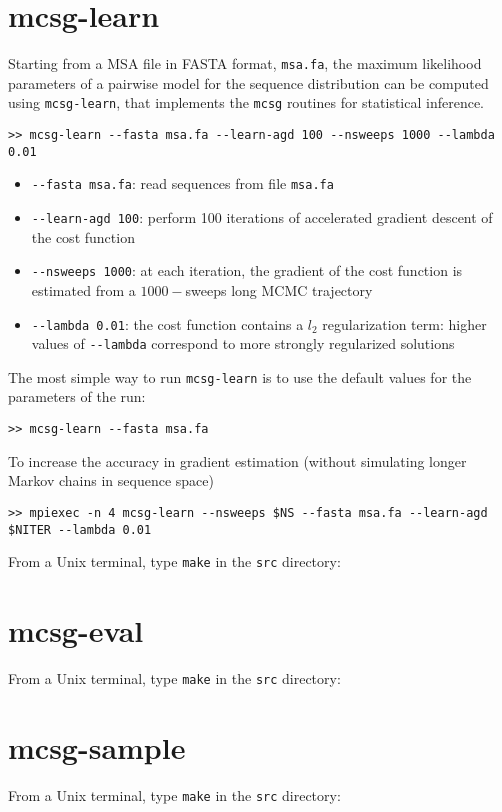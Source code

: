 \documentclass[a4paper,onecolumn]{article}
\begin{document}
\section{mcsg-learn}
\label{sec:mcsg-learn}
Starting from a MSA file in FASTA format, \verb|msa.fa|, the maximum likelihood parameters of a pairwise model for the sequence distribution
can be computed using \verb|mcsg-learn|, that implements the \verb|mcsg| routines for statistical inference.
\begin{verbatim}
>> mcsg-learn --fasta msa.fa --learn-agd 100 --nsweeps 1000 --lambda 0.01
\end{verbatim}
\begin{itemize}
\item \verb|--fasta msa.fa|: read sequences from file \verb|msa.fa|
\item \verb|--learn-agd 100|: perform 100 iterations of accelerated gradient descent of the cost function
\item \verb|--nsweeps 1000|: at each iteration, the gradient of the cost function is estimated from a $1000-$sweeps long MCMC trajectory
\item \verb|--lambda 0.01|: the cost function contains a $l_2$ regularization term: higher values of \verb|--lambda| correspond to more strongly regularized solutions
\end{itemize}


The most simple way to run \verb|mcsg-learn| is to use the default values for the parameters of the run:
\begin{verbatim}
>> mcsg-learn --fasta msa.fa
\end{verbatim}
To increase the accuracy in gradient estimation (without simulating longer Markov chains in sequence space)
\begin{verbatim}
>> mpiexec -n 4 mcsg-learn --nsweeps $NS --fasta msa.fa --learn-agd $NITER --lambda 0.01
\end{verbatim}
From a Unix terminal, type \verb|make| in the \verb|src| directory:

\section{mcsg-eval}
\label{sec:mcsg-eval}
From a Unix terminal, type \verb|make| in the \verb|src| directory:

\section{mcsg-sample}
\label{sec:mcsg-sample}
From a Unix terminal, type \verb|make| in the \verb|src| directory:
\end{document}
